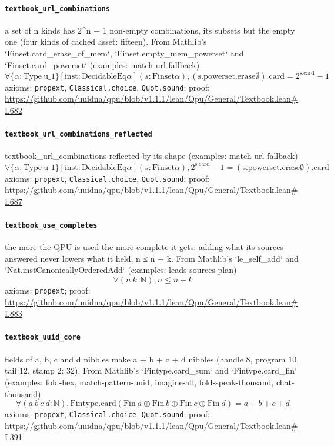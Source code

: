 \documentclass[11pt]{article}
\begin{document}
\paragraph{\texttt{textbook\_url\_combinations}}
a set of n kinds has 2\^{}n − 1 non-empty combinations, its subsets but the empty one (four kinds of cached asset: fifteen). From Mathlib's `Finset.card\_erase\_of\_mem`, `Finset.empty\_mem\_powerset` and `Finset.card\_powerset` (examples: match-url-fallback)
\[ \forall \{\alpha : \mathrm{Type}\ \mathrm{u\_1}\} [\mathrm{inst} : \mathrm{DecidableEq} \alpha ] (s : \mathrm{Finset} \alpha ), (\mathrm{s.powerset.erase} \emptyset )\mathrm{.card} = 2 ^{\mathrm{s.card}} - 1 \]
\noindent axioms: \texttt{propext}, \texttt{Classical.choice}, \texttt{Quot.sound}; proof: \url{https://github.com/uuidna/qpu/blob/v1.1.1/lean/Qpu/General/Textbook.lean\#L682}

\paragraph{\texttt{textbook\_url\_combinations\_reflected}}
textbook\_url\_combinations reflected by its shape (examples: match-url-fallback)
\[ \forall \{\alpha : \mathrm{Type}\ \mathrm{u\_1}\} [\mathrm{inst} : \mathrm{DecidableEq} \alpha ] (s : \mathrm{Finset} \alpha ), 2 ^{\mathrm{s.card}} - 1 = (\mathrm{s.powerset.erase} \emptyset )\mathrm{.card} \]
\noindent axioms: \texttt{propext}, \texttt{Classical.choice}, \texttt{Quot.sound}; proof: \url{https://github.com/uuidna/qpu/blob/v1.1.1/lean/Qpu/General/Textbook.lean\#L687}

\paragraph{\texttt{textbook\_use\_completes}}
the more the QPU is used the more complete it gets: adding what its sources answered never lowers what it held, n ≤ n + k. From Mathlib's `le\_self\_add` and `Nat.instCanonicallyOrderedAdd` (examples: leads-sources-plan)
\[ \forall (n\ k : \mathbb{N}), n \le n + k \]
\noindent axioms: \texttt{propext}; proof: \url{https://github.com/uuidna/qpu/blob/v1.1.1/lean/Qpu/General/Textbook.lean\#L883}

\paragraph{\texttt{textbook\_uuid\_core}}
fields of a, b, c and d nibbles make a + b + c + d nibbles (handle 8, program 10, tail 12, stamp 2: 32). From Mathlib's `Fintype.card\_sum` and `Fintype.card\_fin` (examples: fold-hex, match-pattern-uuid, imagine-all, fold-speak-thousand, chat-thousand)
\[ \forall (a\ b\ c\ d : \mathbb{N}), \mathrm{Fintype.card} (\mathrm{Fin}\ a \oplus \mathrm{Fin}\ b \oplus \mathrm{Fin}\ c \oplus \mathrm{Fin}\ d) = a + b + c + d \]
\noindent axioms: \texttt{propext}, \texttt{Classical.choice}, \texttt{Quot.sound}; proof: \url{https://github.com/uuidna/qpu/blob/v1.1.1/lean/Qpu/General/Textbook.lean\#L391}
\end{document}

